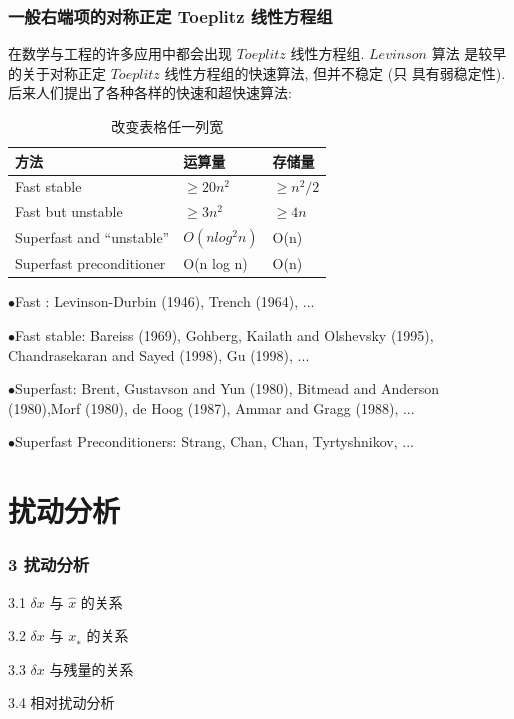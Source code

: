 \documentclass[notheorems,serif]{beamer}
\begin{document}
\begin{frame}
\frametitle{一般右端项的对称正定 Toeplitz 线性方程组}
在数学与工程的许多应用中都会出现 $Toeplitz$ 线性方程组. $Levinson$ 算法
是较早的关于对称正定 $Toeplitz$ 线性方程组的快速算法, 但并不稳定 (只
具有弱稳定性). 后来人们提出了各种各样的快速和超快速算法:

\begin{table}[h] %
	\caption{改变表格任一列宽} %
	\begin{tabular}{p{3.5cm}|p{2cm}|p{5cm}} %
		\hline  
		\hline  
		方法 & 运算量 & 存储量 \\ %
		\hline %
		Fast stable & $≥ 20n^2$& $≥ n^2/2$\\  
		\hline  
		Fast but unstable & $≥ 3n^2$ & $≥ 4n$\\  
		\hline  
		Superfast and “unstable” & $O(n log^2n) $& O(n)\\  
		\hline  
		Superfast preconditioner & O(n log n) & O(n)\\  
		\hline  
		\hline  
	\end{tabular}  
\end{table} 

$\bullet$Fast : Levinson-Durbin (1946), Trench (1964), ...

$\bullet$Fast stable: Bareiss (1969), Gohberg, Kailath and Olshevsky (1995), Chandrasekaran and Sayed (1998), Gu (1998), ...

$\bullet$Superfast: Brent, Gustavson and Yun (1980), Bitmead and Anderson (1980),Morf (1980), de Hoog (1987), Ammar and Gragg (1988), ...

$\bullet$Superfast Preconditioners: Strang, Chan, Chan, Tyrtyshnikov, ...
\end{frame}




\section{扰动分析}

\begin{frame}
\frametitle{3 \quad 扰动分析}
3.1 \qquad $δx$ 与 $\hat{x}$ 的关系

3.2 \qquad $δx$ 与 $x_∗$ 的关系

3.3 \qquad $δx$ 与残量的关系

3.4 \qquad 相对扰动分析

\end{frame}
\end{document}

